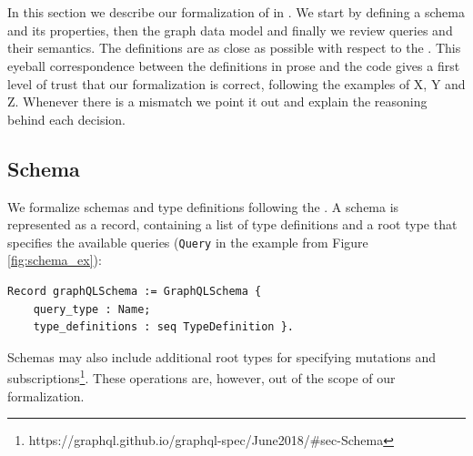 \section{\gcoql}\label{sec:form}

 In this section we describe our formalization of \gql in \coq. We start by defining a schema and its properties, then the graph data model and finally we review queries and their semantics. The definitions are as close as possible with respect to the \spec. This eyeball correspondence between the definitions in prose and the code gives a first level of trust that our formalization is correct, following the examples of X, Y and Z. Whenever there is a mismatch we point it out and explain the reasoning behind each decision.


\subsection{Schema}\label{subsec:schema}
We formalize schemas and type definitions following the \spec. A schema is represented as a record, containing a list of type definitions and a root type that specifies the available queries (\eg \texttt{Query} in the example from Figure \ref{fig:schema_ex}):
%

\begin{verbatim}
Record graphQLSchema := GraphQLSchema {
    query_type : Name;
    type_definitions : seq TypeDefinition }.
\end{verbatim}
%
Schemas may also include additional root types for specifying mutations and subscriptions\footnote{https://graphql.github.io/graphql-spec/June2018/\#sec-Schema}. These operations are, however, out of the scope of our formalization.

